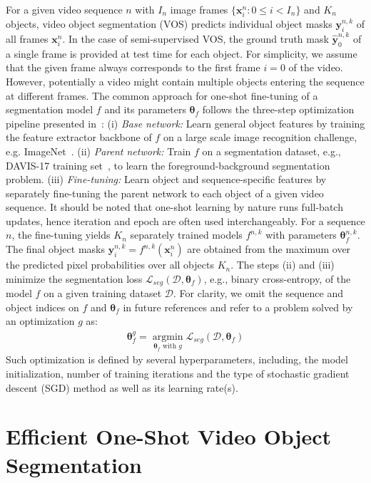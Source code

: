 \documentclass{article}
\begin{document}
    For a given video sequence $n$ with $I_n$ image frames $\{\mathbf{x}_i^n : 0 \leq i < I_n \}$ and $K_n$ objects, video object segmentation (VOS) predicts individual object masks $\mathbf{y}_i^{n,k}$ of all frames $\mathbf{x}_i^n$.
In the case of semi-supervised VOS, the ground truth mask $\mathbf{\hat{y}}_0^{n,k}$ of a single frame is provided at test time for each object.
For simplicity, we assume that the given frame always corresponds to the first frame $i=0$ of the video.
However, potentially a video might contain multiple objects entering the sequence at different frames.
The common approach for one-shot fine-tuning of a segmentation model $f$ and its parameters $\boldsymbol \theta_f$ follows the three-step optimization pipeline presented in~\cite{OSVOS}:
(i) {\it Base network:} Learn general object features by training the feature extractor backbone of $f$ on a large scale image recognition challenge, e.g. ImageNet~\cite{imagenet}.
(ii) {\it Parent network:} Train $f$ on a segmentation dataset, e.g., DAVIS-17 training set~\cite{DAVIS17semi}, to learn the foreground-background segmentation problem.
(iii) {\it Fine-tuning:} Learn object and sequence-specific features by separately fine-tuning the parent network to each object of a given video sequence.
It should be noted that one-shot learning by nature runs full-batch updates, hence iteration and epoch are often used interchangeably.
For a sequence $n$, the fine-tuning yields $K_n$ separately trained models $f^{n,k}$ with parameters $\boldsymbol \theta_f^{n,k}$.
The final object masks $\mathbf{y}_i^{n,k} = f^{n,k}(\mathbf{x}_i^n)$ are obtained from the maximum over the predicted pixel probabilities over all objects $K_n$.
The steps (ii) and (iii) minimize the segmentation loss $\mathcal{L}_{seg}(\mathcal{D}, \boldsymbol \theta_f)$, e.g., binary cross-entropy, of the model $f$ on a given training dataset $\mathcal{D}$.
For clarity, we omit the sequence and object indices on $f$ and $\boldsymbol \theta_f$ in future references and refer to a problem solved by an optimization $g$ as:
\begin{align}
        \boldsymbol \theta_f^{g} = \operatorname*{argmin}_{\boldsymbol \theta_f \text{ with } {g}} \mathcal{L}_{seg}(\mathcal{D}, \boldsymbol \theta_f)
    \end{align}
Such optimization is defined by several hyperparameters, including, the model initialization, number of training iterations and the type of stochastic gradient descent (SGD) method as well as its learning rate(s).

\section{Efficient One-Shot Video Object Segmentation} \label{sec:eosvos}
\end{document}
